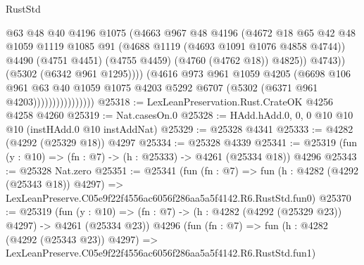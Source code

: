 \begin{lexlean}{RustStd}
\begin{coremodule}
                                    @63
                                    @48
                                    @40
                                    @4196
                                    @1075
                                    (@4663
                                      @967
                                      @48
                                      @4196
                                      (@4672
                                        @18
                                        @65
                                        @42
                                        @48
                                        @1059
                                        @1119
                                        @1085
                                        @91
                                        (@4688 @1119 (@4693 @1091 @1076 @4858 @4744))
                                        @4490
                                        (@4751 @4451)
                                        (@4755 @4459)
                                        (@4760 (@4762 @18))
                                        @4825))
                                    @4743))
                                (@5302 (@6342 @961 @1295))))
                            (@4616
                              @973
                              @961
                              @1059
                              @4205
                              (@6698
                                @106
                                @961
                                @63
                                @40
                                @1059
                                @1075
                                @4203
                                @5292
                                @6707
                                (@5302 (@6371 @961 @4203))))))))))))))))
@25318 := LexLeanPreservation.Rust.CrateOK @4256 @4258 @4260
@25319 := Nat.casesOn.{0}
@25328 := HAdd.hAdd.{0, 0, 0} @10 @10 @10 (instHAdd.{0} @10 instAddNat)
@25329 := @25328 @4341
@25333 := @4282 (@4292 (@25329 @18)) @4297
@25334 := @25328 @4339
@25341 := @25319 (fun (y : @10) => (fn : @7) -> (h : @25333) -> @4261 (@25334 @18)) @4296
@25343 := @25328 Nat.zero
@25351 := @25341
    (fun (fn : @7) =>
    fun (h : @4282 (@4292 (@25343 @18)) @4297) =>
    LexLeanPreserve.C05e9f22f4556ac6056f286aa5a5f4142.R6.RustStd.fun0)
@25370 := @25319
    (fun (y : @10) => (fn : @7) -> (h : @4282 (@4292 (@25329 @23)) @4297) -> @4261 (@25334 @23))
    @4296
    (fun (fn : @7) =>
    fun (h : @4282 (@4292 (@25343 @23)) @4297) =>
    LexLeanPreserve.C05e9f22f4556ac6056f286aa5a5f4142.R6.RustStd.fun1)

\end{coremodule}
\end{lexlean}
